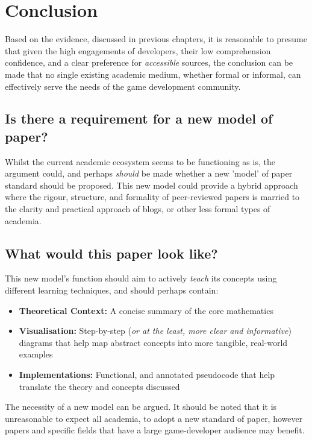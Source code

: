 \chapter{Conclusion}

Based on the evidence, discussed in previous chapters, it is reasonable to presume that given the high engagements of developers, their low comprehension confidence, and
a clear preference for \textit{accessible} sources, the conclusion can be made that no single existing academic medium, whether formal or informal, can effectively serve
the needs of the game development community.

\section{Is there a requirement for a new model of paper?}

Whilst the current academic ecosystem seems to be functioning as is, the argument could, and perhaps \textit{should} be made whether a new 'model' of paper standard should be
proposed. This new model could provide a hybrid approach where the rigour, structure, and formality of peer-reviewed papers is married to the clarity and practical approach of
blogs, or other less formal types of academia.

\section{What would this paper look like?}

This new model's function should aim to actively \textit{teach} its concepts using different learning techniques, and should perhaps contain:

\begin{itemize}
    \item \textbf{Theoretical Context:} A concise summary of the core mathematics
    \item \textbf{Visualisation:} Step-by-step (\textit{or at the least, more clear and informative}) diagrams that help map abstract concepts into more tangible, real-world examples
    \item \textbf{Implementations:} Functional, and annotated pseudocode that help translate the theory and concepts discussed
\end{itemize}

The necessity of a new model can be argued. It should be noted that it is unreasonable to expect all academia, to adopt a new standard of paper,
however papers and specific fields that have a large game-developer audience may benefit.
